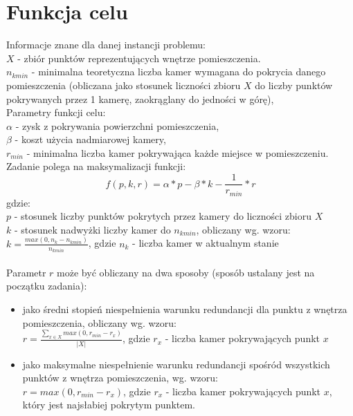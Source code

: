 \documentclass[12pt,a4paper]{article}
\begin{document}
\section{Funkcja celu}
Informacje znane dla danej instancji problemu: \\
$X$ - zbiór punktów reprezentujących wnętrze pomieszczenia. \\
$n_{kmin}$ - minimalna teoretyczna liczba kamer wymagana do pokrycia danego pomieszczenia
(obliczana jako stosunek liczności zbioru $X$ do liczby punktów pokrywanych przez 1 kamerę, zaokrąglany do jedności w górę),\\
%
\newline
Parametry funkcji celu: \\
$\alpha$ - zysk z pokrywania powierzchni pomieszczenia,\\
$\beta$ - koszt użycia nadmiarowej kamery, \\
$r_{min}$ - minimalna liczba kamer pokrywająca każde miejsce w pomieszczeniu. \\
%
\newline
Zadanie polega na maksymalizacji funkcji: \\
$$f(p, k, r) = \alpha * p - \beta * k - \frac{1}{r_{min}} * r $$ 
gdzie: \\
$p$ - stosunek liczby punktów pokrytych przez kamery do liczności zbioru $X$\\
$k$ - stosunek nadwyżki liczby kamer do $n_{kmin}$, obliczany wg. wzoru: \\
\indent $k = \frac{max(0, n_k - n_{kmin})}{n_{kmin}}$, gdzie $n_k$ - liczba kamer w aktualnym stanie \\\\
Parametr $r$ może być obliczany na dwa sposoby (sposób ustalany jest na
początku zadania):
\begin{itemize}
\item jako średni stopień niespełnienia warunku redundancji dla punktu z wnętrza pomieszczenia, obliczany wg. wzoru: \\
\indent $r = \frac{\sum_{x \in X}^{} max(0, r_{min} - r_x)}{|X|}$, gdzie $r_x
$ - liczba kamer pokrywających punkt $x$
\item jako maksymalne niespełnienie warunku redundancji spośród wszystkich
punktów z wnętrza pomieszczenia, wg. wzoru:\\
$r = max(0, r_{min} - r_x)$, gdzie $r_x$ - liczba kamer pokrywających punkt $x$, który jest najsłabiej pokrytym punktem.
\end{itemize}
\end{document}
